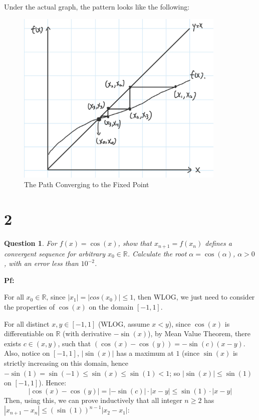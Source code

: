 \documentclass{article}
\newtheorem{question}{Question}
\begin{document}
\begin{itemize}
    Under the actual graph, the pattern looks like the following:

    \begin{figure}[h!]
        \begin{center}
            \includegraphics*[width = 100mm]{118 hw6 p1 pd.jpg}
            \caption{The Path Converging to the Fixed Point}
        \end{center}
    \end{figure}
\end{itemize}

\break

\section*{2}
\begin{myBox}[]{}
    \begin{question}
        For $f(x) = \cos(x)$, show that $x_{n+1}=f(x_n)$ defines a convergent sequence
        for arbitrary $x_0\in\mathbb{R}$. Calculate the root $\alpha=\cos(\alpha)$, $\alpha>0$, with an error less than
        $10^{-2}$.
    \end{question}
\end{myBox}

\textbf{Pf:}

For all $x_0\in\mathbb{R}$, since $|x_1|=|cos(x_0)|\leq 1$, then WLOG, we just need to consider the properties of $\cos(x)$ on the domain $[-1,1]$.

For all distinct $x,y\in[-1,1]$ (WLOG, assume $x<y$), since $\cos(x)$ is differentiable on $\mathbb{R}$ (with derivative $-\sin(x)$), by Mean Value Theorem, 
there exists $c\in (x,y)$, such that $(\cos(x)-\cos(y))=-\sin(c)(x-y)$. Also, notice on $[-1,1]$, $|\sin(x)|$ has a maximum at $1$ 
(since $\sin(x)$ is strictly increasing on this domain, hence $-\sin(1)=\sin(-1)\leq \sin(x)\leq \sin(1) < 1$; so $|\sin(x)|\leq \sin(1)$ on $[-1,1]$). Hence:
$$|\cos(x)-\cos(y)|=|-\sin(c)|\cdot|x-y| \leq \sin(1)\cdot|x-y|$$
Then, using this, we can prove inductively that all integer $n\geq 2$ has $|x_{n+1}-x_n| \leq (\sin(1))^{n-1}|x_2-x_1|$:
\end{document}
